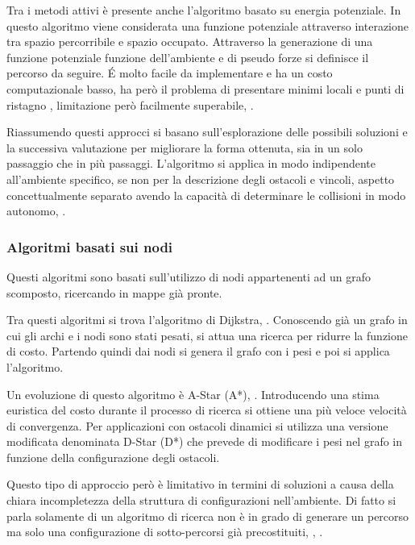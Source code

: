 Tra i metodi attivi è presente anche l'algoritmo basato su energia potenziale. In questo algoritmo viene considerata una funzione potenziale attraverso interazione tra spazio percorribile e spazio occupato. Attraverso la generazione di una funzione potenziale funzione dell'ambiente e di pseudo forze si definisce il percorso da seguire. \'E molto facile da implementare e ha un costo computazionale basso, ha però il problema di presentare minimi locali e punti di ristagno , limitazione però facilmente superabile, \cite{RimonE1992Ernu}.

Riassumendo questi approcci si basano sull'esplorazione delle possibili soluzioni e la successiva valutazione per migliorare la forma ottenuta, sia in un solo passaggio che in più passaggi. L'algoritmo si applica in modo indipendente all'ambiente specifico, se non per la descrizione degli ostacoli e vincoli, aspetto concettualmente separato avendo la capacità di determinare le collisioni in modo autonomo, 
\cite{YangLiang2016SoR3}.


\subsubsection{Algoritmi basati sui nodi}
Questi algoritmi sono basati sull'utilizzo di nodi appartenenti ad un grafo scomposto, ricercando in mappe già pronte.

Tra questi algoritmi si trova l'algoritmo di Dijkstra, \cite{DIJKSTRA1959}. Conoscendo già un grafo in cui gli archi e i nodi sono stati pesati, si attua una ricerca per ridurre la funzione di costo. Partendo quindi dai nodi si genera il grafo con i pesi e poi si applica l'algoritmo. 

Un evoluzione di questo algoritmo è A-Star (A*), \cite{HartPeter1968AFBf}. Introducendo una stima euristica del costo durante il processo di ricerca si ottiene una più veloce velocità di convergenza. Per applicazioni con ostacoli dinamici si utilizza una versione modificata denominata D-Star (D*) che prevede di modificare i pesi nel grafo in funzione della configurazione degli ostacoli. 

Questo tipo di approccio però è limitativo in termini di soluzioni a causa della chiara incompletezza della struttura di configurazioni nell'ambiente. Di fatto si parla solamente di un algoritmo di ricerca non è in grado di generare un percorso ma solo una configurazione di sotto-percorsi già precostituiti, \cite{StentzA1994Oaep}, \cite{YangLiang2016SoR3}.

